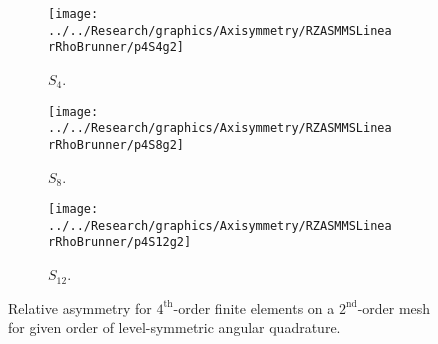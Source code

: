 \documentclass[12pt]{article}
\begin{document}
\begin{sidewaysfigure}[!htb]
\centering
\begin{subfigure}{0.33\textwidth}
\texttt{[image: ../../Research/graphics/Axisymmetry/RZASMMSLinearRhoBrunner/p4S4g2]}
\caption{$S_4$.}
\end{subfigure}%
\begin{subfigure}{0.33\textwidth}
\texttt{[image: ../../Research/graphics/Axisymmetry/RZASMMSLinearRhoBrunner/p4S8g2]}
\caption{$S_8$.}
\end{subfigure}%
\begin{subfigure}{0.33\textwidth}
\texttt{[image: ../../Research/graphics/Axisymmetry/RZASMMSLinearRhoBrunner/p4S12g2]}
\caption{$S_{12}$.}
\end{subfigure}
\caption{Relative asymmetry for $4^\text{th}$-order finite elements on a $2^\text{nd}$-order mesh for given order of level-symmetric angular quadrature.}
\label{fig:RZASMMSLinearRhoBrunnerp4g2}
\end{sidewaysfigure}
\end{document}
